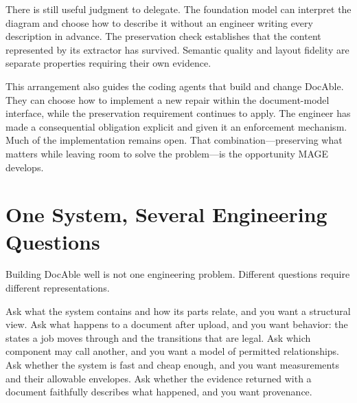There is still useful judgment to delegate. The foundation model can interpret the diagram and choose how to describe it without an engineer writing every description in advance. The preservation check establishes that the content represented by its extractor has survived. Semantic quality and layout fidelity are separate properties requiring their own evidence.


This arrangement also guides the coding agents that build and change DocAble. They can choose how to implement a new repair within the document-model interface, while the preservation requirement continues to apply. The engineer has made a consequential obligation explicit and given it an enforcement mechanism. Much of the implementation remains open. That combination---preserving what matters while leaving room to solve the problem---is the opportunity MAGE develops.

\section{One System, Several Engineering Questions}\label{heading:one-system-several-engineering-questions}



Building DocAble well is not one engineering problem. Different questions require different representations.


Ask what the system contains and how its parts relate, and you want a structural view. Ask what happens to a document after upload, and you want behavior: the states a job moves through and the transitions that are legal. Ask which component may call another, and you want a model of permitted relationships. Ask whether the system is fast and cheap enough, and you want measurements and their allowable envelopes. Ask whether the evidence returned with a document faithfully describes what happened, and you want provenance.

